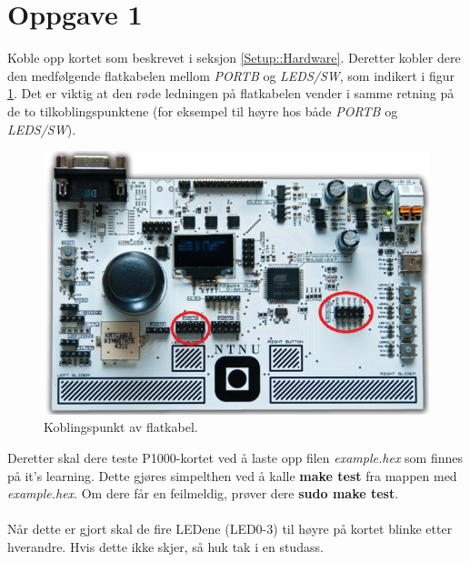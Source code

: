 \documentclass[11pt,a4paper]{article}
\begin{document}
\section{Oppgave 1}
Koble opp kortet som beskrevet i seksjon \ref{Setup::Hardware}. Deretter kobler dere den medfølgende flatkabelen mellom \textit{PORTB} og \textit{LEDS/SW}, som indikert i figur \ref{PORTB::LEDS}. Det er viktig at den røde ledningen på flatkabelen vender i samme retning på de to tilkoblingspunktene (for eksempel til høyre hos både \textit{PORTB} og \textit{LEDS/SW}).
\begin{figure}[htb]
\centering
\includegraphics[width=0.8\linewidth]{portb_leds.png}
\caption{Koblingspunkt av flatkabel.}
\label{PORTB::LEDS}
\end{figure}
Deretter skal dere teste P1000-kortet ved å laste opp filen \textit{example.hex} som finnes på it's learning. Dette gjøres simpelthen ved å kalle \textbf{make test} fra mappen med \textit{example.hex}. Om dere får en feilmeldig, prøver dere \textbf{sudo make test}.\\
\\
Når dette er gjort skal de fire LEDene (LED0-3) til høyre på kortet blinke etter hverandre. Hvis dette ikke skjer, så huk tak i en studass.
\end{document}

